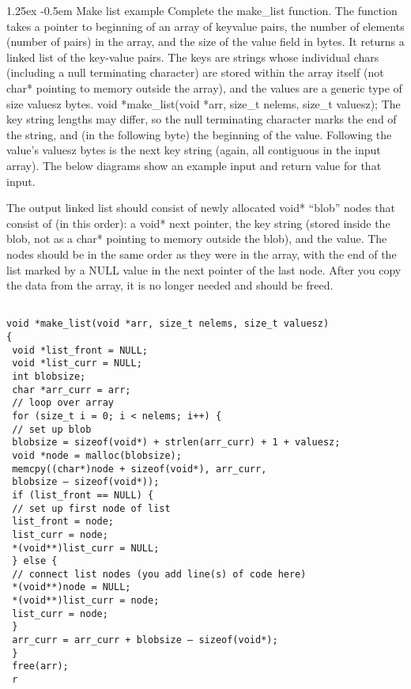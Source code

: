 \documentclass[10pt]{article}
\makeatletter
\newlength{\norm}
\newlength{\nrm}
\renewcommand{\paragraph}{%
  \@startsection{paragraph}{4}%
  {\z@}{1.25ex \@plus 2pt \@minus 2pt}{-0.5em}%
  {\fontsize{\f@size}{\nrm}\normalfont\bfseries}%
}
\makeatother
\begin{document}
{\begin{multicols*}{5}

\paragraph{Make list example}
Complete the make\_list function. The function takes a pointer to beginning of an array of keyvalue
pairs, the number of elements (number of pairs) in the array, and the size of the value field
in bytes. It returns a linked list of the key-value pairs. The keys are strings whose individual
chars (including a null terminating character) are stored within the array itself (not char*
pointing to memory outside the array), and the values are a generic type of size valuesz bytes.
void *make\_list(void *arr, size\_t nelems, size\_t valuesz);
The key string lengths may differ, so the null terminating character marks the end of the string,
and (in the following byte) the beginning of the value. Following the value’s valuesz bytes is
the next key string (again, all contiguous in the input array). The below diagrams show an
example input and return value for that input.

The output linked list should consist of newly allocated void* “blob” nodes that consist of (in
this order): a void* next pointer, the key string (stored inside the blob, not as a char* pointing
to memory outside the blob), and the value. The nodes should be in the same order as they were
in the array, with the end of the list marked by a NULL value in the next pointer of the last node.
After you copy the data from the array, it is no longer needed and should be freed.


\begin{lstlisting}[breaklines=true,columns=fullflexible]

void *make_list(void *arr, size_t nelems, size_t valuesz)
{
 void *list_front = NULL;
 void *list_curr = NULL;
 int blobsize;
 char *arr_curr = arr;
 // loop over array
 for (size_t i = 0; i < nelems; i++) {
 // set up blob
 blobsize = sizeof(void*) + strlen(arr_curr) + 1 + valuesz;
 void *node = malloc(blobsize);
 memcpy((char*)node + sizeof(void*), arr_curr,
 blobsize – sizeof(void*));
 if (list_front == NULL) {
 // set up first node of list
 list_front = node;
 list_curr = node;
 *(void**)list_curr = NULL;
 } else {
 // connect list nodes (you add line(s) of code here)
 *(void**)node = NULL;
 *(void**)list_curr = node;
 list_curr = node;
 }
 arr_curr = arr_curr + blobsize – sizeof(void*);
 }
 free(arr);
 r
\end{lstlisting}


\end{multicols*}}
\end{document}
